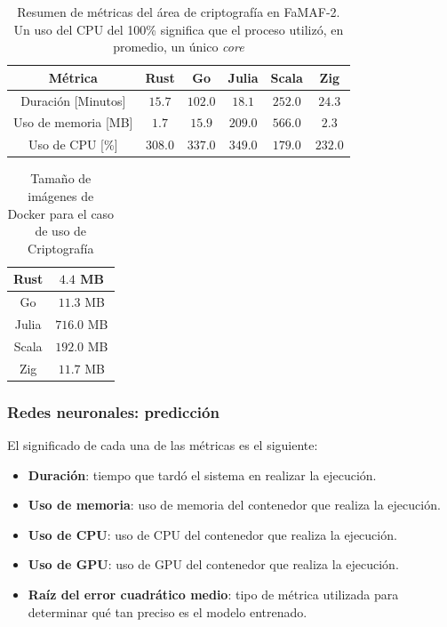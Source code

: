 \documentclass[11pt]{article}
\let\Oldsubsubsection\subsubsection
\renewcommand{\subsubsection}{\FloatBarrier\Oldsubsubsection}
\newcommand{\english}[1]{\textit{#1}}
\begin{document}
\begin{table}[H]
\centering
\begin{tabular}{|c|c|c|c|c|c|}
\hline
Métrica & Rust & Go & Julia & Scala & Zig \\ \hline
Duración [Minutos] & $15.7$ & $102.0$ & $18.1$ & $252.0$ & $24.3$ \\ \hline
Uso de memoria [MB] & $1.7$ & $15.9$ & $209.0$ & $566.0$ & $2.3$ \\ \hline
Uso de CPU [\%] & $308.0$ & $337.0$ & $349.0$ & $179.0$ & $232.0$ \\ \hline
\end{tabular}
\caption{Resumen de métricas del área de criptografía en FaMAF-2. Un uso del CPU del 100\% significa que el proceso utilizó, en promedio, un único \english{core}}
\label{tab:aes:famaf_2}
\end{table}

\begin{table}[H]
\centering
\begin{tabular}{|c|c|}
\hline
Rust & $4.4$ MB \\ \hline
Go & $11.3$ MB \\ \hline
Julia & $716.0$ MB \\ \hline
Scala & $192.0$ MB \\ \hline
Zig & $11.7$ MB \\ \hline
\end{tabular}
\caption{Tamaño de imágenes de Docker para el caso de uso de Criptografía}
\label{tab:aes:container_metrics}
\end{table}

\subsubsection{Redes neuronales: predicción} \label{sec:anex:metrics:nn}

El significado de cada una de las métricas es el siguiente:

\begin{itemize}
    \item \textbf{Duración}: tiempo que tardó el sistema en realizar la ejecución.
    \item \textbf{Uso de memoria}: uso de memoria del contenedor que realiza la ejecución.
    \item \textbf{Uso de CPU}: uso de CPU del contenedor que realiza la ejecución.
    \item \textbf{Uso de GPU}: uso de GPU del contenedor que realiza la ejecución.
    \item \textbf{Raíz del error cuadrático medio}: tipo de métrica utilizada para determinar qué tan preciso es el modelo entrenado.
\end{itemize}
\end{document}
